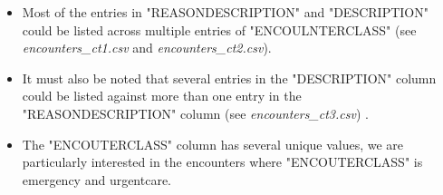 \documentclass[12pt, twosided]{report}  %
\begin{document}
\begin{itemize}
	\item Most of the entries in "REASONDESCRIPTION" and "DESCRIPTION" could be listed across multiple entries of "ENCOULNTERCLASS" (see \textit{encounters\_ct1.csv} and \textit{encounters\_ct2.csv}).
	
	
	
	\item It must also be noted that several entries in the "DESCRIPTION" column could be listed against more than one entry in the "REASONDESCRIPTION" column (see \textit{encounters\_ct3.csv}) .
	
	\item The "ENCOUTERCLASS" column has several unique values, we are particularly interested in the encounters where "ENCOUTERCLASS" is emergency and urgentcare.
	
\end{itemize}
\end{document}
